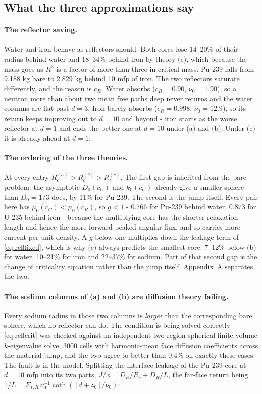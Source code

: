{\color{red}
\FloatBarrier
\subsection*{What the three approximations say}

\paragraph{The reflector saving.} Water and iron behave as reflectors should. Both cores lose 14--20\% of their radius behind water and 18--34\% behind iron by theory (c), which because the mass goes as $R^3$ is a factor of more than three in critical mass: Pu-239 falls from 9.188 kg bare to 2.829 kg behind 10 mfp of iron. The two reflectors saturate differently, and the reason is $c_R$. Water absorbs ($c_R = 0.90$, $\nu_0 = 1.90$), so a neutron more than about two mean free paths deep never returns and the water columns are flat past $d = 3$. Iron barely absorbs ($c_R = 0.998$, $\nu_0 = 12.9$), so its return keeps improving out to $d = 10$ and beyond - iron starts as the worse reflector at $d=1$ and ends the better one at $d = 10$ under (a) and (b). Under (c) it is already ahead at $d = 1$.

\paragraph{The ordering of the three theories.} At every entry $R_c^{(a)} > R_c^{(b)} > R_c^{(c)}$. The first gap is inherited from the bare problem: the asymptotic $D_0(c_C)$ and $k_0(c_C)$ already give a smaller sphere than $D_0 = 1/3$ does, by 11\% for Pu-239. The second is the jump itself. Every pair here has $\mu_0(c_C) < \mu_0(c_R)$, so $g < 1$ - $0.766$ for Pu-239 behind water, $0.873$ for U-235 behind iron - because the multiplying core has the shorter relaxation length and hence the more forward-peaked angular flux, and so carries more current per unit density. A $g$ below one multiplies down the leakage term of \eqref{eq:reflfixed}, which is why (c) always predicts the smallest core: 7--12\% below (b) for water, 10--21\% for iron and 22--37\% for sodium. Part of that second gap is the change of criticality equation rather than the jump itself. Appendix~A separates the two.

\paragraph{The sodium columns of (a) and (b) are diffusion theory failing.} Every sodium radius in those two columns is \emph{larger} than the corresponding bare sphere, which no reflector can do. The condition is being solved correctly - \eqref{eq:reflcrit} was checked against an independent two-region spherical finite-volume $k$-eigenvalue solve, 3000 cells with harmonic-mean face diffusion coefficients across the material jump, and the two agree to better than $0.4\%$ on exactly these cases. The fault is in the model. Splitting the interface leakage of the Pu-239 core at $d = 10$ mfp into its two parts, $J/\phi = D_R/R_c + D_R/L$, the far-face return being $1/L = \Sigma_{t,R}\,\nu_0^{-1}\coth\!\left(\left[d+z_0\right]/\nu_0\right)$:


}
